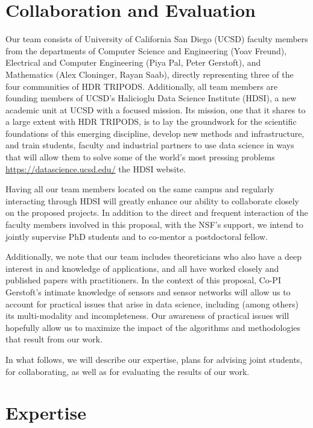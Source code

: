 \documentclass{article}
\begin{document}
\section{Collaboration and Evaluation}
\vspace{1cm}

Our team consists of University of California San Diego (UCSD) faculty members from the departments of Computer Science and Engineering (Yoav Freund), Electrical and Computer Engineering (Piya Pal, Peter Gerstoft), and Mathematics (Alex Cloninger, Rayan Saab), directly representing three of the four communities of HDR TRIPODS.  Additionally, all team members are founding members of UCSD's Halicioglu Data Science Institute (HDSI), a new academic unit at UCSD with a focused mission. Its mission, one that it shares to a large extent with HDR TRIPODS, is to lay the groundwork for the scientific foundations of this emerging discipline, develop new methods and infrastructure, and train students, faculty and industrial partners to use data science in ways that will allow them to solve some of the world’s most pressing problems \url{https://datascience.ucsd.edu/}{ the HDSI website}. 

Having all our team members located on the same campus and regularly interacting through HDSI will greatly enhance our ability to collaborate closely on the proposed projects. In addition to the direct and frequent interaction of the faculty members involved in this proposal, with the NSF's support, we intend to jointly supervise PhD students and to co-mentor a postdoctoral fellow. 

Additionally, we note that our team includes theoreticians who also have a deep interest in and knowledge of applications, and all  have worked closely and published papers with practitioners. In the context of this proposal, Co-PI Gerstoft's intimate knowledge of sensors and sensor networks will allow us to account for practical issues that arise in data science, including (among others) its multi-modality and incompleteness. Our awareness of practical issues will hopefully allow us to maximize the impact of the algorithms and methodologies that result from our work.  

In what follows, we will describe our expertise, plans for advising joint students, for collaborating, as well as for evaluating the results of our work.  
 
 \vspace{1cm}
\section{Expertise}
\end{document}

